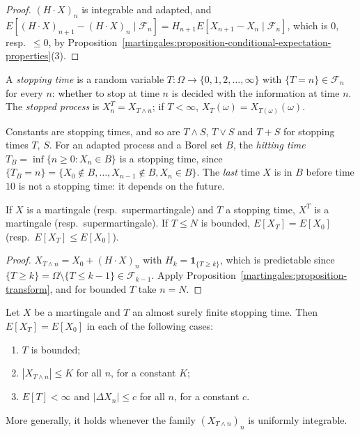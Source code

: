 \begin{proof}
$(H \cdot X)_n$ is integrable and adapted, and $E[(H \cdot X)_{n+1} - (H \cdot X)_n \mid \mathcal{F}_n] = H_{n+1}E[X_{n+1} - X_n \mid \mathcal{F}_n]$, which is $0$, resp.\ $\leq 0$, by
Proposition~\ref{martingales:proposition-conditional-expectation-properties}(3).
\end{proof}

\begin{definition}\label{martingales:definition-stopping-time}
A \emph{stopping time} is a random variable $T \colon \Omega \to \{0, 1, 2, \ldots, \infty\}$ with $\{T = n\} \in \mathcal{F}_n$ for every $n$: whether to stop at time $n$ is decided with the information at time $n$. The
\emph{stopped process} is $X^T_n = X_{T \wedge n}$; if $T < \infty$, $X_T(\omega) = X_{T(\omega)}(\omega)$.
\end{definition}

\begin{example}\label{martingales:example-stopping-times}
Constants are stopping times, and so are $T \wedge S$, $T \vee S$ and $T + S$ for stopping times $T$, $S$. For an adapted process and a Borel set $B$, the \emph{hitting time} $T_B = \inf\{n \geq 0 : X_n \in B\}$ is a stopping time,
since $\{T_B = n\} = \{X_0 \notin B, \ldots, X_{n-1} \notin B, X_n \in B\}$. The \emph{last} time $X$ is in $B$ before time $10$ is not a stopping time: it depends on the future.
\end{example}

\begin{proposition}\label{martingales:proposition-stopped}
If $X$ is a martingale (resp.\ supermartingale) and $T$ a stopping time, $X^T$ is a martingale (resp.\ supermartingale). If $T \leq N$ is bounded, $E[X_T] = E[X_0]$ (resp.\ $E[X_T] \leq E[X_0]$).
\end{proposition}

\begin{proof}
$X_{T \wedge n} = X_0 + (H \cdot X)_n$ with $H_k = \mathbf{1}_{\{T \geq k\}}$, which is predictable since $\{T \geq k\} = \Omega \setminus \{T \leq k - 1\} \in \mathcal{F}_{k-1}$. Apply Proposition~\ref{martingales:proposition-transform}, and
for bounded $T$ take $n = N$.
\end{proof}

\begin{theorem}\label{martingales:theorem-optional-stopping}
Let $X$ be a martingale and $T$ an almost surely finite stopping time. Then $E[X_T] = E[X_0]$ in each of the following cases:
\begin{enumerate}
\item $T$ is bounded;
\item $|X_{T \wedge n}| \leq K$ for all $n$, for a constant $K$;
\item $E[T] < \infty$ and $|\Delta X_n| \leq c$ for all $n$, for a constant $c$.
\end{enumerate}
More generally, it holds whenever the family $(X_{T \wedge n})_n$ is uniformly integrable.
\end{theorem}

